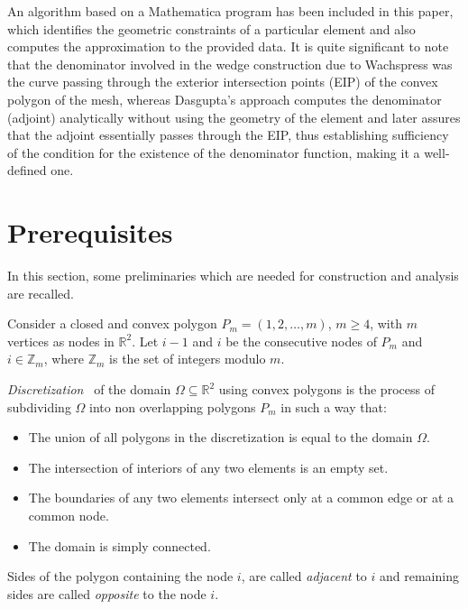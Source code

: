 \documentclass[automatic-bibliography, defaultmaths=false]{univsciauth}
\begin{document}
An algorithm based on a Mathematica program has been included in this paper,
which identifies the geometric constraints of a particular element and also
computes the approximation to the provided data. It is quite significant to note
that the denominator involved in the wedge construction due to Wachspress was
the curve passing through the exterior intersection points (EIP) of the convex
polygon of the mesh, whereas Dasgupta's approach computes the denominator
(adjoint) analytically without using the geometry of the element and later
assures that the adjoint essentially passes through the EIP, thus establishing
sufficiency of the condition for the existence of the denominator function,
making it a well-defined one.

\section{Prerequisites}\label{sec2}
In this section, some preliminaries which are needed for construction and
analysis are recalled.

Consider a closed and convex polygon $P_m = (1,2,\ldots,m)$, $m \geq 4$, with
$m$ vertices as nodes in $\mathbb{R}^2$. Let $i-1$ and $i$ be the consecutive
nodes of $P_m$ and $i \in \mathbb{Z}_m$, where $\mathbb{Z}_m$ is the set of
integers modulo $m$.

\begin{definition}
  \emph{Discretization}~\cite{phi} of the domain
  $\Omega \subseteq \mathbb{R}^2$ using convex polygons is the process of
  subdividing $\Omega$ into non overlapping polygons $P_m$ in such a way that:
        \begin{itemize}
          \item The union of all polygons in the discretization is equal
                to the domain $\Omega$.
          \item The intersection of interiors of any two elements is an empty
                set.
          \item The boundaries of any two elements intersect only at a
                common edge or at a common node.
          \item The domain is simply connected.
        \end{itemize}
\end{definition}

\begin{definition}
  Sides of the polygon containing the node $i$, are called \emph{adjacent}
  to $i$ and remaining sides are called \emph{opposite} to the node $i$.
\end{definition}
\end{document}

